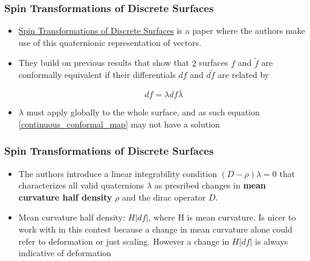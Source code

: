 \documentclass{beamer}
\begin{document}
\begin{frame}
\frametitle{Spin Transformations of Discrete Surfaces}
\begin{itemize}
\item \href{https://www.cs.cmu.edu/~kmcrane/Projects/SpinTransformations/}{Spin Transformations of Discrete Surfaces} is a paper where the authors make use of this quaternionic representation of vectors.
\item They build on previous results that show that $2$ surfaces $f$ and $\tilde{f}$ are conformally equivalent if their differentials $df$ and $d\tilde{f}$ are related by 

\begin{equation} \label{continuous_conformal_map}
df = \lambda df \bar{\lambda}
\end{equation}

\item $\lambda$ must apply globally to the whole surface, and as such equation \ref{continuous_conformal_map} may not have a solution
\end{itemize}
\end{frame}

\begin{frame}
\frametitle{Spin Transformations of Discrete Surfaces}
\begin{itemize}
\item The authors introduce a linear integrability condition $(D-\rho)\lambda = 0$ that characterizes all valid quaternions $\lambda$ as presribed changes in \textbf{mean curvature half density} $\rho$ and the dirac operator $D$. 
\item Mean curvature half density: $H|df|$, where H is mean curvature. Is nicer to work with in this contest because a change in mean curvature alone could refer to deformation or just scaling. However a change in $H|df|$ is always indicative of deformation
\end{itemize}
\end{frame}
\end{document}
